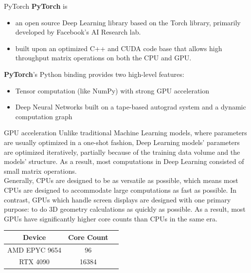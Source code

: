 \documentclass{beamer}
\begin{document}
\begin{frame}[fragile]{PyTorch}
    \textbf{PyTorch} is
    \begin{itemize}
        \item an open source Deep Learning library based on the Torch library, primarily developed by Facebook's AI Research lab.
        \item built upon an optimized C++ and CUDA code base that allows high throughput matrix operations on both the CPU and GPU.
    \end{itemize}
    \textbf{PyTorch}'s Python binding provides two high-level features:
    \begin{itemize}
        \item Tensor computation (like NumPy) with strong GPU acceleration
        \item Deep Neural Networks built on a tape-based autograd system and a dynamic computation graph
    \end{itemize}
\end{frame}
\begin{frame}[fragile]{GPU acceleration}
    Unlike traditional Machine Learning models, where parameters are usually optimized in a one-shot fashion, Deep Learning models' parameters are optimized iteratively, partially because of the training data volume and the models' structure. As a result, most computations in Deep Learning consisted of small matrix operations.\\
    Generally, CPUs are designed to be as versatile as possible, which means most CPUs are designed to accommodate large computations as fast as possible. In contrast, GPUs which handle screen displays are designed with one primary purpose: to do 3D geometry calculations as quickly as possible. As a result, most GPUs have significantly higher core counts than CPUs in the same era.\\
    \begin{center}
        \begin{tabular}{| c | c | c |}
            \hline
            \textbf{Device} & \textbf{Core Count} \\
            \hline
            AMD EPYC 9654 & 96 \\
            RTX 4090 & 16384 \\
            \hline
        \end{tabular}
    \end{center}
\end{frame}
\end{document}
